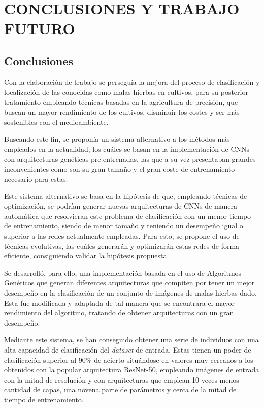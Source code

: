 %
\chapter{CONCLUSIONES Y TRABAJO FUTURO}
\label{sec:conclusiones}

\section{Conclusiones}

Con la elaboración de trabajo se perseguía la mejora del proceso de clasificación y localización de las conocidas como malas hierbas en cultivos, para su posterior tratamiento empleando técnicas basadas en la agricultura de precisión, que buscan un mayor rendimiento de los cultivos, disminuir los costes y ser más sostenibles con el medioambiente.

Buscando este fin, se proponía un sistema alternativo a los métodos más empleados en la actualidad, los cuáles se basan en la implementación de CNNs con arquitecturas genéticas pre-entrenadas, las que a su vez presentaban grandes inconvenientes como son su gran tamaño y el gran coste de entrenamiento necesario para estas.

Este sistema alternativo se basa en la hipótesis de que, empleando técnicas de optimización, se podrían generar nuevas arquitecturas de CNNs de manera automática que resolvieran este problema de clasificación con un menor tiempo de entrenamiento, siendo de menor tamaño y teniendo un desempeño igual o superior a las redes actualmente empleadas. Para esto, se propone el uso de técnicas evolutivas, las cuáles generarán y optimizarán estas redes de forma eficiente, consiguiendo validar la hipótesis propuesta.

Se desarrolló, para ello, una implementación basada en el uso de Algoritmos Genéticos que generan diferentes arquitecturas que compiten por tener un mejor desempeño en la clasificación de un conjunto de imágenes de malas hierbas dado. Esta fue modificada y adaptada de tal manera que se encontrara el mayor rendimiento del algoritmo, tratando de obtener arquitecturas con un gran desempeño.

Mediante este sistema, se han conseguido obtener una serie de individuos con una alta capacidad de clasificación del \textit{dataset} de entrada. Estas tienen un poder de clasificación superior al 90\% de acierto situándose en valores muy cercanos a los obtenidos con la popular arquitectura ResNet-50, empleando imágenes de entrada con la mitad de resolución y con arquitecturas que emplean 10 veces menos cantidad de capas, una novena parte de parámetros y cerca de la mitad de tiempo de entrenamiento.

